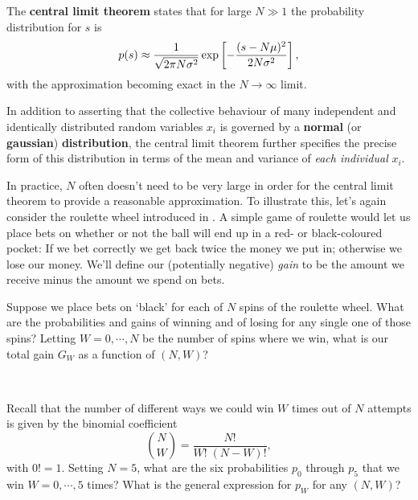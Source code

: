 \begin{shaded}
  The \textbf{central limit theorem} states that for large $N \gg 1$ the probability distribution for $s$ is
  \begin{equation}
    \label{eq:CLT}
    p(s) \approx \frac{1}{\sqrt{2\pi N\sigma^2}} \exp\left[-\frac{(s - N\mu)^2}{2N\sigma^2}\right],
  \end{equation}
  with the approximation becoming exact in the $N \to \infty$ limit.
\end{shaded}
In addition to asserting that the collective behaviour of many independent and identically distributed random variables $x_i$ is governed by a \textbf{normal} (or \textbf{gaussian}) \textbf{distribution}, the central limit theorem further specifies the precise form of this distribution in terms of the mean and variance of \textit{each individual} $x_i$. %

In practice, $N$ often doesn't need to be very large in order for the central limit theorem to provide a reasonable approximation.
To illustrate this, let's again consider the roulette wheel introduced in .
A simple game of roulette would let us place bets on whether or not the ball will end up in a red- or black-coloured pocket: If we bet correctly we get back twice the money we put in; otherwise we lose our money.
We'll define our (potentially negative) \textit{gain} to be the amount we receive minus the amount we spend on bets.

\newpage %
Suppose we place  bets on `black' for each of $N$ spins of the roulette wheel.
What are the probabilities and gains of winning and of losing for any single one of those spins?
Letting $W = 0, \cdots, N$ be the number of spins where we win, what is our total gain $G_W$ as a function of $(N, W)$?
\begin{mdframed}
  \ \\[100 pt]
\end{mdframed}
Recall that the number of different ways we could win $W$ times out of $N$ attempts is given by the binomial coefficient
\begin{equation*}
  \binom{N}{W} = \frac{N!}{W! \; (N - W)!},
\end{equation*}
with $0! = 1$.
Setting $N = 5$, what are the six probabilities $p_0$ through $p_5$ that we win $W = 0, \cdots, 5$ times?
What is the general expression for $p_W$ for any $(N, W)$?
\begin{mdframed}
  \ \\[100 pt]
\end{mdframed}

